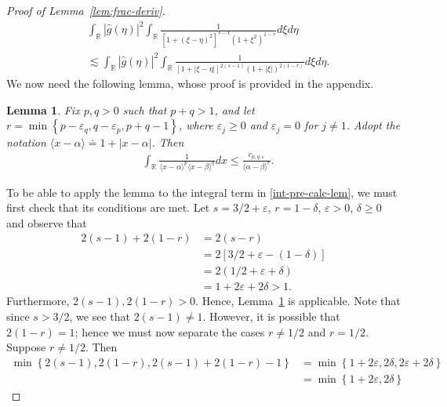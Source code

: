 \documentclass[12pt,reqno]{amsart}
\numberwithin{equation}{section}  %
\numberwithin{figure}{section}
\newcommand{\rr}{\mathbb{R}}
\newcommand{\wh}{\widehat}
\newcommand{\ee}{\varepsilon}
\newtheorem{lemma}[theorem]{Lemma}
\begin{document}
\begin{proof}[Proof of Lemma~\ref{lem:frac-deriv}]
\begin{equation}
  \label{int-pre-calc-lem}
\begin{split}
  & \int_{\rr} | \wh{g}(\eta) |^{2} \int_{\rr} \frac{1}{\left[
  1 + (\xi - \eta)^{2} \right]^{s-1} (1 + \xi^{2})^{1-r}} d \xi d \eta
  \\
  & \lesssim \int_{\rr} | \wh{g}(\eta) |^{2} \int_{\rr} \frac{1}{\left[
  1 + |\xi - \eta| \right]^{2(s-1)} (1 + |\xi|)^{2(1-r)}} d \xi d \eta.
\end{split}
\end{equation}
%
%
We now need the following lemma, whose proof is provided in the appendix.
%
%
\begin{lemma}
	\label{lem:calc}
  Fix $p, q > 0$ such that $p +q >1$, and let $r =\min\left\{p - \ee_{q}, q - \ee_{p}, p+q-1
 \right\}$, where $\ee_{j} \ge 0$ and $\ee_{j} = 0$ for $j \neq 1$. Adopt the notation
 $\langle x - \alpha \rangle  \doteq 1 + | x - \alpha |$. Then 
  \begin{equation*}
\begin{split}
  & \int_{\rr} \frac{1}{\langle x - \alpha \rangle ^{p} \langle x -
  \beta \rangle
  ^{q}} d x
  \le \frac{c_{p,q, \ee}}{\langle \alpha - \beta \rangle ^{r}}. 
  \end{split}
\end{equation*}
\end{lemma}
To be able to apply the lemma to the integral term in \eqref{int-pre-calc-lem}, 
we must first check
that its conditions are met. Let $ s = 3/2 + \ee$, $r = 1- \delta$, $\ee > 0$, $
\delta \ge 0$ and observe that
%
%
\begin{equation*}
\begin{split}
2(s-1) + 2(1-r)
& = 2(s-r)
\\
& = 2[3/2 + \ee - (1 - \delta)]
\\
& = 2(1/2 + \ee + \delta)
\\
& = 1 + 2 \ee + 2 \delta > 1.
\end{split}
\end{equation*}
%
%
Furthermore, $2(s-1), 2(1-r) > 0$. Hence, Lemma~\ref{lem:calc} is applicable. 
Note that since $s > 3/2$, we see that $2(s-1) \neq 1$. However, it is possible that $2(1-r) =1$; hence we must now separate the cases $r \neq 1/2$ and $r = 1/2$. Suppose $r \neq 1/2$. Then 
%
%
\begin{equation*}
\begin{split}
  \min\left\{ 2(s-1), 2(1-r), 2(s-1) + 2(1-r) -1 \right\}
  & = \min\left\{ 1 + 2 \ee, 2 \delta, 2\ee + 2 \delta \right\}
  \\
  & = \min\left\{ 1 + 2 \ee, 2 \delta\right\}

\end{split}
\end{equation*}
\end{proof}
\end{document}
